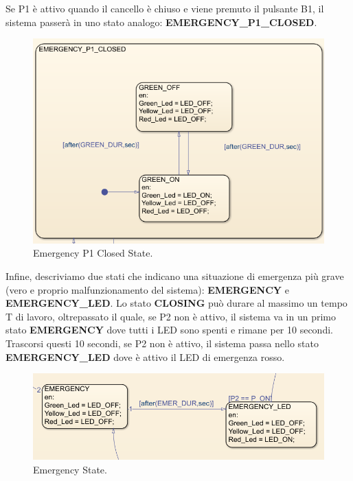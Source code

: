 \documentclass[12pt]{article}
\begin{document}
Se P1 è attivo quando il cancello è chiuso e viene premuto il pulsante B1, il sistema passerà in uno stato analogo: \textbf{EMERGENCY\_P1\_CLOSED}.

\begin{figure}[H]
    \centering
    \includegraphics[width=1\textwidth]{Immagini_State_Flow/Emergency_P1_Closed.png}
    \caption{Emergency P1 Closed State.}
\end{figure}

Infine, descriviamo due stati che indicano una situazione di emergenza più grave (vero e proprio malfunzionamento del sistema): \textbf{EMERGENCY} e \textbf{EMERGENCY\_LED}. Lo stato \textbf{CLOSING} può durare al massimo un tempo T di lavoro, oltrepassato il quale, se P2 non è attivo, il sistema va in un primo stato \textbf{EMERGENCY} dove tutti i LED sono spenti e rimane per 10 secondi. Trascorsi questi 10 secondi, se P2 non è attivo, il sistema passa nello stato \textbf{EMERGENCY\_LED} dove è attivo il LED di emergenza rosso.

\begin{figure}[H]
    \centering
    \includegraphics[width=1\textwidth]{Immagini_State_Flow/Emergency.png}
    \caption{Emergency State.}
\end{figure}
\end{document}
